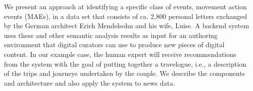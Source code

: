 We present an approach at identifying a specific class of events, movement action events (MAEs), in a data set that consists of ca. 2,800 personal letters exchanged by the German architect Erich Mendelsohn and his wife, Luise. A backend system uses these and other semantic analysis results as input for an authoring environment that digital curators can use to produce new pieces of digital content. In our example case, the human expert will receive recommendations from the system with the goal of putting together a travelogue, i.e., a description of the trips and journeys undertaken by the couple. We describe the components and architecture and also apply the system to news data.
